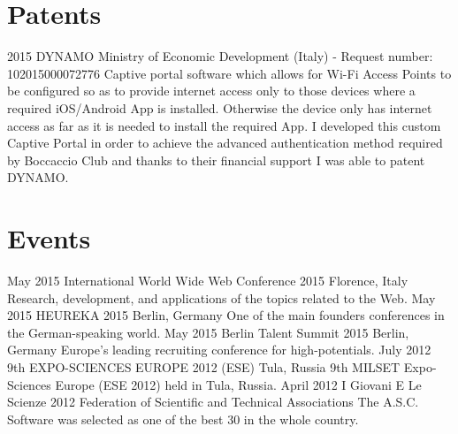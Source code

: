 \documentclass[]{friggeri-cv} %
\begin{document}
\section{Patents}
\vspace{-3mm}
\begin{entrylist}
\entry
{2015}
{DYNAMO}
{Ministry of Economic Development (Italy) - Request number: 102015000072776}
{Captive portal software which allows for Wi-Fi Access Points to be configured so as to provide internet access only to those devices where a required iOS/Android App is installed. Otherwise the device only has internet access as far as it is needed to install the required App. I developed this custom Captive Portal in order to achieve the advanced authentication method required by Boccaccio Club and thanks to their financial support I was able to patent DYNAMO.}
\end{entrylist}


\section{Events}
\vspace{-3mm}
\begin{entrylist}
\entry
{May 2015}
{International World Wide Web Conference 2015}
{Florence, Italy}
{Research, development, and applications of the topics related to the Web.}
\entry
{May 2015}
{HEUREKA 2015}
{Berlin, Germany}
{One of the main founders conferences in the German­-speaking world.}
\entry
{May 2015}
{Berlin Talent Summit 2015}
{Berlin, Germany}
{Europe's leading recruiting conference for high-potentials.}
\entry
{July 2012}
{9th EXPO-SCIENCES EUROPE 2012 (ESE)}
{Tula, Russia}
{9th MILSET Expo-Sciences Europe (ESE 2012) held in Tula, Russia.}
\entry
{April 2012}
{I Giovani E Le Scienze 2012}
{Federation of Scientific and Technical Associations}
{The A.S.C. Software was selected as one of the best 30 in the whole country.}
\end{entrylist}
\end{document}
